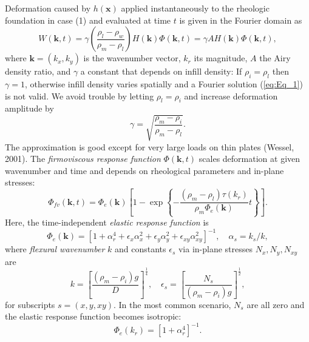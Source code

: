 \documentclass[12pt]{article}
\begin{document}
Deformation caused by $h(\mathbf{x})$ applied instantaneously to the
rheologic foundation in case (1) and evaluated at time $t$ is given in the Fourier domain as
\begin{equation}
W(\mathbf{k},t) = \gamma \left (\frac{\rho_l - \rho_w}{\rho_m - \rho_l} \right ) H(\mathbf{k}) \Phi(\mathbf{k},t) = \gamma A H(\mathbf{k}) \Phi(\mathbf{k},t),
\label{eq:Eq_1}
\end{equation}
where $\mathbf{k} = (k_x, k_y)$ is the wavenumber vector, $k_r$ its magnitude, $A$ the Airy density ratio,
and $\gamma$ a constant that depends on infill density: If $\rho_i = \rho_l$ then $\gamma = 1$,
otherwise infill density varies spatially and a Fourier solution (\ref{eq:Eq_1}) is not valid.
We avoid trouble by letting $\rho_l = \rho_i$ and increase deformation amplitude by
\begin{equation}
\gamma = \sqrt{\frac{\rho_m - \rho_i}{\rho_m - \rho_l}}.
\label{eq:Eq_3}
\end{equation}
The approximation is good except for very large loads on thin plates (Wessel, 2001).
The {\it firmoviscous response function} $\Phi(\mathbf{k},t)$ scales deformation at given wavenumber and time
and depends on rheological parameters and in-plane stresses:
\begin{equation}
\Phi_{fv}(\mathbf{k},t) = \Phi_e(\mathbf{k}) \left [ 1 - \exp \left \{ - \frac{(\rho_m - \rho_l) \tau(k_r)}{\rho_m\Phi_e(\mathbf{k})} t \right \} \right ].
\end{equation}
Here, the time-independent {\it elastic response function} is
\begin{equation}
\Phi_e(\mathbf{k}) = \left [ 1 + \alpha_r^4 + \epsilon_x \alpha_x^2 + \epsilon_y \alpha_y^2 + \epsilon_{xy} \alpha_{xy}^2 \right ]^{-1}, \quad \alpha_s = k_s / k,
\label{eq:Eq_5}
\end{equation}
where {\it flexural wavenumber} $k$ and constants $\epsilon_s$ via in-plane stresses $N_x, N_y, N_{xy}$ are
\begin{equation}
k = \left [ \frac{(\rho_m - \rho_i)g}{D} \right ]^{\frac{1}{4}}, \quad \epsilon_s = \left [ \frac{N_s}{(\rho_m - \rho_i)g} \right ]^{\frac{1}{2}},
\label{eq:Eq_7}
\end{equation}
for subscripts $s = \left (x, y, xy \right )$.
In the most common scenario, $N_s$ are all zero and the elastic response function becomes isotropic:
\begin{equation}
\Phi_e(k_r) = \left [ 1 + \alpha_r^4 \right ]^{-1}.
\label{eq:Eq_9}
\end{equation}
\end{document}
